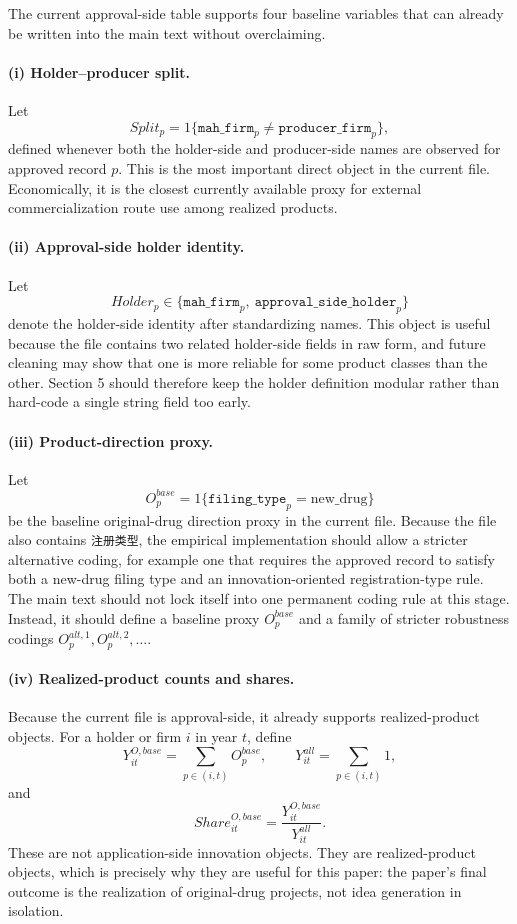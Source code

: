 \documentclass[12pt]{article}
\begin{document}
The current approval-side table supports four baseline variables that can already be written into
the main text without overclaiming.

\paragraph{(i) Holder--producer split.}
Let
\[
Split_p = 1\{\texttt{mah\_firm}_p \neq \texttt{producer\_firm}_p\},
\]
defined whenever both the holder-side and producer-side names are observed for approved record
$p$. This is the most important direct object in the current file. Economically, it is the closest
currently available proxy for external commercialization route use among realized products.

\paragraph{(ii) Approval-side holder identity.}
Let
\[
Holder_p \in \{\texttt{mah\_firm}_p,\ \texttt{approval\_side\_holder}_p\}
\]
denote the holder-side identity after standardizing names. This object is useful because the file
contains two related holder-side fields in raw form, and future cleaning may show that one is more reliable for
some product classes than the other. Section 5 should therefore keep the holder definition modular
rather than hard-code a single string field too early.

\paragraph{(iii) Product-direction proxy.}
Let
\[
O_p^{base}=1\{\texttt{filing\_type}_p=\text{new\_drug}\}
\]
be the baseline original-drug direction proxy in the current file. Because the file also contains
\texttt{注册类型}, the empirical implementation should allow a stricter alternative coding,
for example one that requires the approved record to satisfy both a new-drug filing type and an
innovation-oriented registration-type rule. The main text should not lock itself into one permanent
coding rule at this stage. Instead, it should define a baseline proxy \(O_p^{base}\) and a family of
stricter robustness codings \(O_p^{alt,1}, O_p^{alt,2}, \dots\).

\paragraph{(iv) Realized-product counts and shares.}
Because the current file is approval-side, it already supports realized-product objects. For a holder
or firm \(i\) in year \(t\), define
\[
Y_{it}^{O,base}=\sum_{p\in(i,t)} O_p^{base},
\qquad
Y_{it}^{all}=\sum_{p\in(i,t)} 1,
\]
and
\[
Share_{it}^{O,base}=\frac{Y_{it}^{O,base}}{Y_{it}^{all}}.
\]
These are not application-side innovation objects. They are realized-product objects, which is
precisely why they are useful for this paper: the paper's final outcome is the realization of
original-drug projects, not idea generation in isolation.
\end{document}
